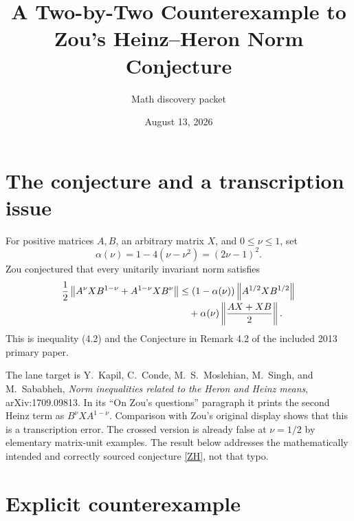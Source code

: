 \documentclass[11pt]{article}
\title{A Two-by-Two Counterexample to\\Zou's Heinz--Heron Norm Conjecture}
\author{Math discovery packet}
\date{August 13, 2026}
\begin{document}
\maketitle

\begin{center}
\end{center}

\section{The conjecture and a transcription issue}

For positive matrices \(A,B\), an arbitrary matrix \(X\), and
\(0\leq\nu\leq1\), set
\[
 \alpha(\nu)=1-4(\nu-\nu^2)=(2\nu-1)^2.
\]
Zou conjectured that every unitarily invariant norm satisfies
\begin{align}
 \frac12\left\lVert A^\nu XB^{1-\nu}+A^{1-\nu}XB^\nu\right\rVert
 &\leq (1-\alpha(\nu))\left\lVert A^{1/2}XB^{1/2}\right\rVert
 \notag\\[-2pt]
 &\quad+\alpha(\nu)\left\lVert\frac{AX+XB}{2}\right\rVert .
 \label{ZH}
\end{align}
This is inequality (4.2) and the Conjecture in Remark 4.2 of the
included 2013 primary paper.

The lane target is Y.~Kapil, C.~Conde, M.~S.~Moslehian, M.~Singh, and
M.~Sababheh, \emph{Norm inequalities related to the Heron and Heinz
means}, arXiv:1709.09813.  In its ``On Zou's questions'' paragraph it
prints the second Heinz term as \(B^\nu XA^{1-\nu}\).  Comparison with
Zou's original display shows that this is a transcription error.  The
crossed version is already false at \(\nu=1/2\) by elementary matrix-unit
examples.  The result below addresses the mathematically intended and
correctly sourced conjecture \eqref{ZH}, not that typo.

\section{Explicit counterexample}
\end{document}

